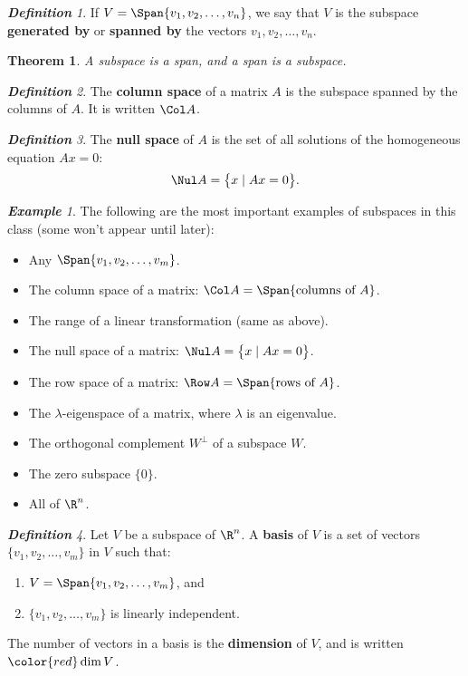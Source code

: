 \documentclass[12pt]{amsart}
\theoremstyle{plain}
\newtheorem*{Thm}{Theorem}
\theoremstyle{remark}
\newtheorem*{Defn}{\bf Definition}
\newtheorem*{Eg}{\bf Example}
\begin{document}
\begin{Defn}
  If $V = \Span\{v_1,v_2,\ldots,v_n\}$, we say that $V$ is the subspace
  \textbf{generated by} or \textbf{spanned by} the vectors $v_1,v_2,\ldots,v_n$.
\end{Defn}

\begin{Thm}
  A subspace is a span, and a span is a subspace.
\end{Thm}

\begin{Defn}
  The \textbf{\color{red}column space} of a matrix $A$ is the subspace spanned
  by the columns of $A$.  It is written $\Col A$.
\end{Defn}

\begin{Defn}
  The \textbf{\color{red}null space} of $A$ is the set of all solutions of the
  homogeneous equation $Ax=0$:
  \[ \Nul A = \bigl\{ x\mid Ax=0 \bigr\}. \]
\end{Defn}

\begin{Eg}
  The following are the most important examples of subspaces in this class (some
  won't appear until later):
  \begin{itemize}
  \item Any $\Span\{v_1,v_2,\ldots,v_m\}$.
  \item The column space of a matrix: 
    $\Col A = \Span\{\text{columns of $A$}\}$.
  \item The range of a linear transformation (same as above).
  \item The null space of a matrix:
    $\Nul A = \bigl\{ x\mid Ax = 0 \bigr\}$.
  \item The row space of a matrix:
    $\Row A = \Span\{\text{rows of $A$}\}$.
  \item The $\lambda$-eigenspace of a matrix, where $\lambda$ is an eigenvalue.
  \item The orthogonal complement $W^\perp$ of a subspace $W$.
  \item The zero subspace $\{0\}$.
  \item All of $\R^n$.
  \end{itemize}
\end{Eg}

\begin{Defn}
  Let $V$ be a subspace of $\R^n$.  A \textbf{\color{red}basis} of $V$ is a set
  of vectors $\{v_1,v_2,\ldots,v_m\}$ in $V$ such that:
  \begin{enumerate}
  \item $V = \Span\{v_1,v_2,\ldots,v_m\}$, and
  \item $\{v_1,v_2,\ldots,v_m\}$ is linearly independent.
  \end{enumerate}
  The number of vectors in a basis is the \textbf{\color{red}dimension} of $V$,
  and is written $\color{red}\dim V$.
\end{Defn}
\end{document}
